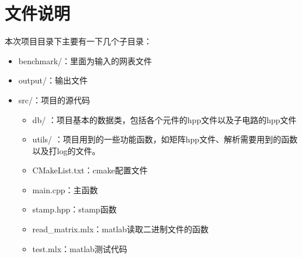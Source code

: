 \documentclass[12pt]{article}
\begin{document}
\section{文件说明}
\qquad 本次项目目录下主要有一下几个子目录：\par
\begin{itemize}
  \item benchmark/：里面为输入的网表文件
  \item output/：输出文件
  \item src/：项目的源代码
  \begin{itemize}
    \item db/ ：项目基本的数据类，包括各个元件的hpp文件以及子电路的hpp文件
    \item utils/ ：项目用到的一些功能函数，如矩阵hpp文件、解析需要用到的函数以及打log的文件。
    \item CMakeList.txt：cmake配置文件
    \item main.cpp：主函数
    \item stamp.hpp：stamp函数
    \item read\_matrix.mlx：matlab读取二进制文件的函数
    \item test.mlx：matlab测试代码
  \end{itemize}
\end{itemize}
\end{document}
